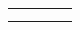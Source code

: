 \documentclass[10pt,]{article}
\theoremstyle{plain}
\theoremstyle{definition}
\theoremstyle{definition}
\theoremstyle{definition}
\theoremstyle{definition}
\theoremstyle{definition}
\theoremstyle{definition}
\numberwithin{equation}{section}
\newlength{\panelmax}
\begin{document}
{\ifdefined\phDimage\else\newlength{\phDimage}\fi%
\setlength{\phDimage}{\ht\panelboxDimage+\dp\panelboxDimage}
\settototalheight{\phDimage}{\usebox{\panelboxDimage}}
\setlength{\panelmax}{\maxof{\panelmax}{\phDimage}}
\leavevmode%
\setlength{\tabcolsep}{0.025\linewidth}
\par\medskip\noindent
\hspace*{0.025\linewidth}%
\begin{tabular}{@{}*{4}{c}@{}}
\begin{minipage}[c][\panelmax][t]{0.2\linewidth}\usebox{\panelboxAimage}\end{minipage}&
\begin{minipage}[c][\panelmax][t]{0.2\linewidth}\usebox{\panelboxBimage}\end{minipage}&
\begin{minipage}[c][\panelmax][t]{0.2\linewidth}\usebox{\panelboxCimage}\end{minipage}&
\begin{minipage}[c][\panelmax][t]{0.2\linewidth}\usebox{\panelboxDimage}\end{minipage}\tabularnewline
\parbox[t]{0.2\linewidth}{
}&
\parbox[t]{0.2\linewidth}{
}&
\parbox[t]{0.2\linewidth}{
}&
\parbox[t]{0.2\linewidth}{
}\end{tabular}\\
}%
\end{document}
